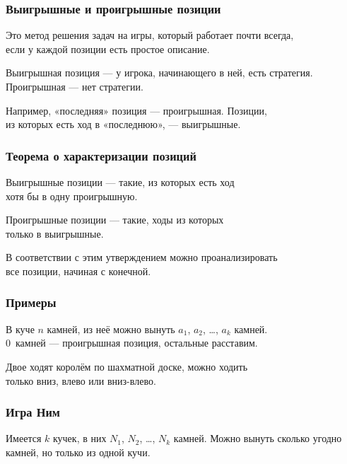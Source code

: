 \begin{frame} \frametitle{Выигрышные и проигрышные позиции}
Это метод решения задач на игры, который работает почти всегда, \\
если у каждой позиции есть простое описание.

Выигрышная позиция — у игрока, начинающего в ней, есть стратегия. \\
Проигрышная — нет стратегии.

Например, «последняя» позиция — проигрышная. Позиции, \\
из которых есть ход в «последнюю», — выигрышные.
\end{frame}

\begin{frame} \frametitle{Теорема о характеризации позиций}
Выигрышные позиции — такие, из которых есть ход \\
хотя бы в одну проигрышную.

Проигрышные позиции — такие, ходы из которых \\
только в выигрышные.

В соответствии с этим утверждением можно проанализировать \\
все позиции, начиная с конечной.
\end{frame}

\begin{frame} \frametitle{Примеры}
В куче $n$ камней, из неё можно вынуть $a_1$, $a_2$, \ldots, $a_k$ камней. \\
0~камней — проигрышная позиция, остальные расставим. \pause

Двое ходят королём по шахматной доске, можно ходить \\
только вниз, влево или вниз-влево. \pause

\begin{center}  \end{center}
\end{frame}

\begin{frame} \frametitle{Игра Ним}
	Имеется $k$ кучек, в них $N_1$, $N_2$, \ldots, $N_k$ камней. Можно вынуть сколько угодно камней, но только из одной кучи. \medskip

\begin{center} \end{center}
\end{frame}


